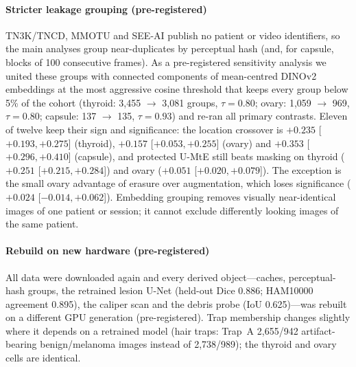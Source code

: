\paragraph{Stricter leakage grouping (pre-registered)}
TN3K/TNCD, MMOTU and SEE-AI publish no patient or video identifiers, so the main analyses group near-duplicates by
perceptual hash (and, for capsule, blocks of 100 consecutive frames). As a pre-registered sensitivity analysis we
united these groups with connected components of mean-centred DINOv2 embeddings at the most aggressive cosine
threshold that keeps every group below 5\% of the cohort (thyroid: 3,455 $\to$ 3,081 groups, $\tau=0.80$; ovary:
1,059 $\to$ 969, $\tau=0.80$; capsule: 137 $\to$ 135, $\tau=0.93$) and re-ran all primary contrasts. Eleven of twelve
keep their sign and significance: the location crossover is $+0.235$ [$+0.193, +0.275$] (thyroid), $+0.157$
[$+0.053, +0.255$] (ovary) and $+0.353$ [$+0.296, +0.410$] (capsule), and protected U-MtE still beats masking on
thyroid ($+0.251$ [$+0.215, +0.284$]) and ovary ($+0.051$ [$+0.020, +0.079$]). The exception is the small ovary
advantage of erasure over augmentation, which loses significance ($+0.024$ [$-0.014, +0.062$]). Embedding grouping
removes visually near-identical images of one patient or session; it cannot exclude differently looking images of
the same patient.

\paragraph{Rebuild on new hardware (pre-registered)}
All data were downloaded again and every derived object---caches, perceptual-hash groups, the retrained lesion U-Net
(held-out Dice 0.886; HAM10000 agreement 0.895), the caliper scan and the debris probe (IoU 0.625)---was rebuilt on a
different GPU generation (pre-registered). Trap membership changes slightly where it depends on a retrained model
(hair traps: Trap~A 2,655/942 artifact-bearing benign/melanoma images instead of 2,738/989); the thyroid and ovary
cells are identical. 

